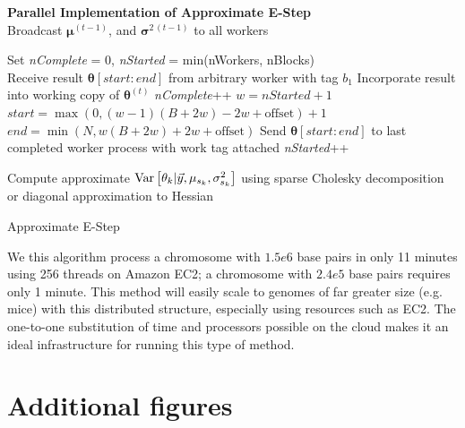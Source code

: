 \begin{algorithm}%
 \hspace{-8pt} \textbf{Parallel Implementation of Approximate E-Step}\\
 Broadcast $\bm \mu^{(t-1)}$, and $\bm \sigma^{2\,(t-1)}$ to all workers \;

  {

 Set \textit{nComplete} = 0, \textit{nStarted} = min(nWorkers, nBlocks) \\
  {
   Receive result $\bm \theta[start:end]$ from arbitrary worker with tag $b_1$ \;
   Incorporate result into working copy of $\bm \theta^{(t)}$ \;
   \textit{nComplete}++ \;
    {
     $w = nStarted + 1$\;
     $start = \max(0, (w - 1)(B + 2w) - 2w + \mbox{offset}) + 1$\;
     $end = \min(N, w(B + 2w) + 2w + \mbox{offset})$\;
     Send $\bm \theta[start:end] $ to last completed worker process with work tag attached\;
     \textit{nStarted}++\;
   }
 }
 }

 Compute approximate $\operatorname{Var} \left[ \theta_k | \vec y, \mu_{s_k}, \sigma^2_{s_k}  \right]$ using sparse Cholesky decomposition or diagonal approximation to Hessian\;

 \caption{Approximate E-Step \label{supp:nucleosomes:alg:parallel}}
\end{algorithm}

We this algorithm process a chromosome with $1.5e6$ base pairs in only 11 minutes using 256 threads on Amazon EC2; a chromosome with $2.4e5$ base pairs requires only 1 minute.
This method will easily scale to genomes of far greater size (e.g. mice) with this distributed structure, especially using resources such as EC2.
The one-to-one substitution of time and processors possible on the cloud makes it an ideal infrastructure for running this type of method.



\section{Additional figures}

